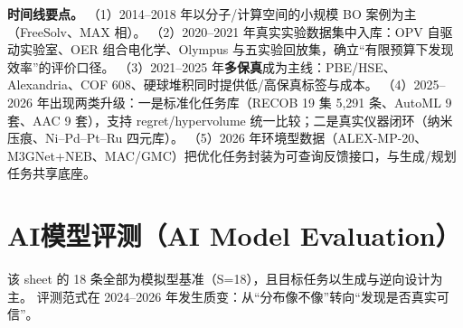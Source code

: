 \documentclass[11pt,a4paper]{ctexart}
\begin{document}
\textbf{时间线要点。}
（1）2014--2018 年以分子/计算空间的小规模 BO 案例为主（FreeSolv、MAX 相）。
（2）2020--2021 年真实实验数据集中入库：OPV 自驱动实验室、OER 组合电化学、Olympus 与五实验回放集，确立``有限预算下发现效率''的评价口径。
（3）2021--2025 年\textbf{多保真}成为主线：PBE/HSE、Alexandria、COF 608、硬球堆积同时提供低/高保真标签与成本。
（4）2025--2026 年出现两类升级：一是标准化任务库（RECOB 19 集 5,291 条、AutoML 9 套、AAC 9 套），支持 regret/hypervolume 统一比较；二是真实仪器闭环（纳米压痕、Ni--Pd--Pt--Ru 四元库）。
（5）2026 年环境型数据（ALEX-MP-20、M3GNet+NEB、MAC/GMC）把优化任务封装为可查询反馈接口，与生成/规划任务共享底座。

\section{AI模型评测（AI Model Evaluation）}

该 sheet 的 18 条全部为模拟型基准（S=18），且目标任务以生成与逆向设计为主。
评测范式在 2024--2026 年发生质变：从``分布像不像''转向``发现是否真实可信''。
\end{document}
